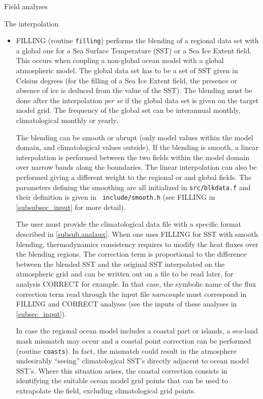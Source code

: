 \begin{subsection}{Field analyses}
\begin{subsubsection}{The interpolation}
\begin{itemize}
\item FILLING (routine {\tt filling}) performs the blending of a
regional data set with a global one for a Sea Surface Temperature 
(SST) or
a Sea Ice Extent field. This occurs when coupling a non-global ocean 
model with a global atmospheric model. The global data set has to be 
a set of SST given in Celsius degrees (for the
filling of a Sea Ice Extent field, the presence or
absence of ice is deduced from the value of the SST). The blending must
be done after
the interpolation {\it per se} if the global data set is given on the
target model grid. The frequency of the global set
can be interannual monthly, climatological monthly or yearly. 

The blending can be smooth or abrupt (only model values
within the model domain, and climatological values outside). If the 
blending is smooth, a linear interpolation is performed between the
two fields within the model domain over narrow bands along
the boundaries.  The linear interpolation can also be performed
giving a different weight to the regional or and global fields.
The parameters defining the smoothing are all initialized
in {\tt src/blkdata.f} and their definition is given in {\tt
include/smooth.h} (see FILLING in \ref{subsubsec_input} for more
detail).

The user must provide the climatological data file with
a specific format described in \ref{subsub.analaux}. 
When one uses FILLING for SST with smooth blending, thermodynamics 
consistency requires to modify the heat fluxes over the blending 
regions. The correction term is proportional to the difference between
the blended SST and the original SST interpolated on the atmospheric 
grid and can be written out on a file to be read later, for analysis
CORRECT for example. In that case, the symbolic name of the flux
correction term read through the input file {\em namcouple} must 
correspond in FILLING and CORRECT analyses (see the inputs of 
these analyses in \ref{subsec_input}).

In case the regional ocean model includes a coastal part or islands, a sea-land
mask mismatch may occur and a coastal point correction can be
performed (routine {\tt coasts}). In fact, the mismatch could result 
in the atmosphere undesirably
``seeing'' climatological SST's directly adjacent to ocean model SST's.
Where this situation arises, the coastal correction consists in 
identifying the suitable ocean model grid points that can be used to
extrapolate the field, excluding climatological grid points.


\end{itemize}
\end{subsubsection}
\end{subsection}

